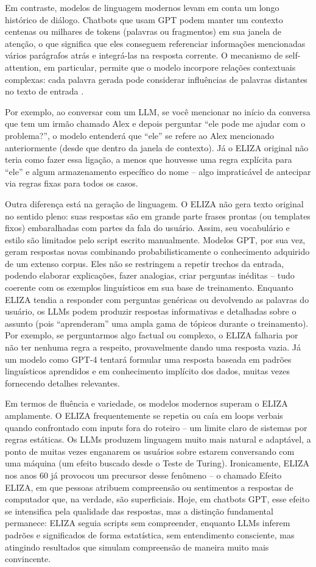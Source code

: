 \documentclass[14pt,a4paper,oneside]{book}
\begin{document}
Em contraste, modelos de linguagem modernos levam em conta um longo histórico de diálogo. Chatbots que usam GPT podem manter um contexto centenas ou milhares de tokens (palavras ou fragmentos) em sua janela de atenção, o que significa que eles conseguem referenciar informações mencionadas vários parágrafos atrás e integrá-las na resposta corrente. O mecanismo de self-attention, em particular, permite que o modelo incorpore relações contextuais complexas: cada palavra gerada pode considerar influências de palavras distantes no texto de entrada \cite{Vaswani2017}.

Por exemplo, ao conversar com um LLM, se você mencionar no início da conversa que tem um irmão chamado Alex e depois perguntar “ele pode me ajudar com o problema?”, o modelo entenderá que “ele” se refere ao Alex mencionado anteriormente (desde que dentro da janela de contexto). Já o ELIZA original não teria como fazer essa ligação, a menos que houvesse uma regra explícita para “ele” e algum armazenamento específico do nome – algo impraticável de antecipar via regras fixas para todos os casos.

Outra diferença está na geração de linguagem. O ELIZA não gera texto original no sentido pleno: suas respostas são em grande parte frases prontas (ou templates fixos) embaralhadas com partes da fala do usuário. Assim, seu vocabulário e estilo são limitados pelo script escrito manualmente. Modelos GPT, por sua vez, geram respostas novas combinando probabilisticamente o conhecimento adquirido de um extenso corpus. Eles não se restringem a repetir trechos da entrada, podendo elaborar explicações, fazer analogias, criar perguntas inéditas – tudo coerente com os exemplos linguísticos em sua base de treinamento. Enquanto ELIZA tendia a responder com perguntas genéricas ou devolvendo as palavras do usuário, os LLMs podem produzir respostas informativas e detalhadas sobre o assunto (pois “aprenderam” uma ampla gama de tópicos durante o treinamento). Por exemplo, se perguntarmos algo factual ou complexo, o ELIZA falharia por não ter nenhuma regra a respeito, provavelmente dando uma resposta vazia. Já um modelo como GPT-4 tentará formular uma resposta baseada em padrões linguísticos aprendidos e em conhecimento implícito dos dados, muitas vezes fornecendo detalhes relevantes.

Em termos de fluência e variedade, os modelos modernos superam o ELIZA amplamente. O ELIZA frequentemente se repetia ou caía em loops verbais quando confrontado com inputs fora do roteiro – um limite claro de sistemas por regras estáticas. Os LLMs produzem linguagem muito mais natural e adaptável, a ponto de muitas vezes enganarem os usuários sobre estarem conversando com uma máquina (um efeito buscado desde o Teste de Turing). Ironicamente, ELIZA nos anos 60 já provocou um precursor desse fenômeno – o chamado Efeito ELIZA, em que pessoas atribuem compreensão ou sentimentos a respostas de computador que, na verdade, são superficiais. Hoje, em chatbots GPT, esse efeito se intensifica pela qualidade das respostas, mas a distinção fundamental permanece: ELIZA seguia scripts sem compreender, enquanto LLMs inferem padrões e significados de forma estatística, sem entendimento consciente, mas atingindo resultados que simulam compreensão de maneira muito mais convincente. 
\end{document}
